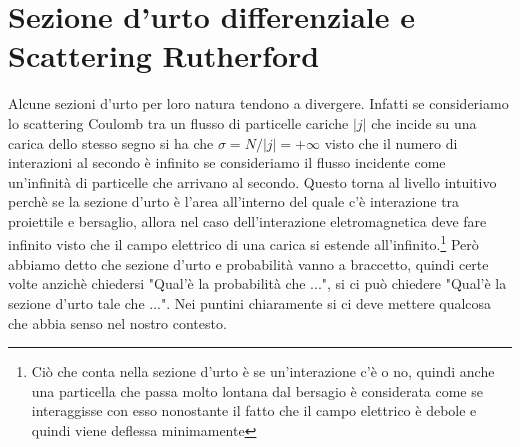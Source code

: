 \documentclass[11pt,a4paper]{report}
\begin{document}
	\section{Sezione d'urto differenziale e Scattering Rutherford}
		Alcune sezioni d'urto per loro natura tendono a divergere. Infatti se consideriamo lo scattering Coulomb tra un flusso di particelle cariche $|j|$ che incide su una carica dello stesso segno si ha che $\sigma=N/|j|=+\infty$ visto che il numero di interazioni al secondo è infinito se consideriamo il flusso incidente come un'infinità di particelle che arrivano al secondo.\newline
		Questo torna al livello intuitivo perchè se la sezione d'urto è l'area all'interno del quale c'è interazione tra proiettile e bersaglio, allora nel caso dell'interazione eletromagnetica deve fare infinito visto che il campo elettrico di una carica si estende all'infinito.\footnote{Ciò che conta nella sezione d'urto è se un'interazione c'è o no, quindi anche una particella che passa molto lontana dal bersagio è considerata come se interaggisse con esso nonostante il fatto che il campo elettrico è debole e quindi viene deflessa minimamente}\newline
		Però abbiamo detto che sezione d'urto e probabilità vanno a braccetto, quindi certe volte anzichè chiedersi "Qual'è la probabilità che ...", si ci può chiedere "Qual'è la sezione d'urto tale che ...". Nei puntini chiaramente si ci deve mettere qualcosa che abbia senso nel nostro contesto.\newline
\end{document}
